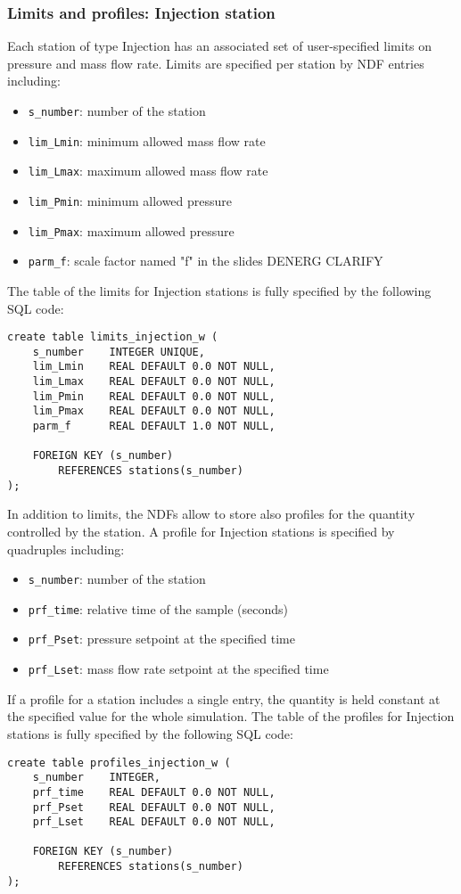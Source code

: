 \documentclass[10pt]{article}
\begin{document}
\subsubsection{Limits and profiles: Injection station}
Each station of type Injection has an associated set of user-specified limits on pressure
and mass flow rate. Limits are specified per station by NDF entries including:
\begin{itemize}
    \item \texttt{s\_number}:   number of the station
    \item \texttt{lim\_Lmin}:   minimum allowed mass flow rate
    \item \texttt{lim\_Lmax}:   maximum allowed mass flow rate
    \item \texttt{lim\_Pmin}:   minimum allowed pressure
    \item \texttt{lim\_Pmax}:   maximum allowed pressure
    \item \texttt{parm\_f}:     scale factor named "f" in the slides DENERG CLARIFY
\end{itemize}
The table of the limits for Injection stations is fully specified by the following SQL code:
\begin{verbatim}
create table limits_injection_w (
    s_number    INTEGER UNIQUE,
    lim_Lmin    REAL DEFAULT 0.0 NOT NULL,
    lim_Lmax    REAL DEFAULT 0.0 NOT NULL,
    lim_Pmin    REAL DEFAULT 0.0 NOT NULL,
    lim_Pmax    REAL DEFAULT 0.0 NOT NULL,
    parm_f      REAL DEFAULT 1.0 NOT NULL,

    FOREIGN KEY (s_number)
        REFERENCES stations(s_number)
);
\end{verbatim}
In addition to limits, the NDFs allow to store also profiles for the quantity
controlled by the station. A profile for Injection stations is specified by quadruples including:
\begin{itemize}
    \item \texttt{s\_number}:   number of the station
    \item \texttt{prf\_time}:   relative time of the sample (seconds)
    \item \texttt{prf\_Pset}:   pressure setpoint at the specified time
    \item \texttt{prf\_Lset}:   mass flow rate setpoint at the specified time
\end{itemize}
If a profile for a station includes a single entry, the quantity is held constant
at the specified value for the whole simulation. The table of the profiles for
Injection stations is fully specified by the following SQL code:
\begin{verbatim}
create table profiles_injection_w (
    s_number    INTEGER,
    prf_time    REAL DEFAULT 0.0 NOT NULL,
    prf_Pset    REAL DEFAULT 0.0 NOT NULL,
    prf_Lset    REAL DEFAULT 0.0 NOT NULL,

    FOREIGN KEY (s_number)
        REFERENCES stations(s_number)
);
\end{verbatim}
\end{document}
